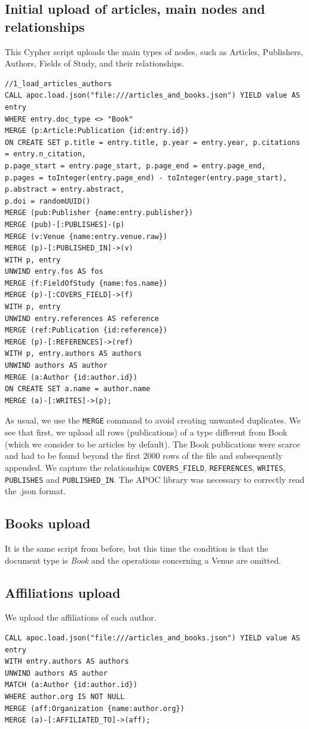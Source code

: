 \documentclass{Configuration_Files/PoliMi3i_thesis}
\begin{document}
\subsection{Initial upload of articles, main nodes and relationships}
This Cypher script uploads the main types of nodes, such as Articles, Publishers, Authors, Fields of Study, and their relationships.\\
\begin{lstlisting}[language=cypher, label=lst:cypher-example]
//1_load_articles_authors
CALL apoc.load.json("file:///articles_and_books.json") YIELD value AS 
entry
WHERE entry.doc_type <> "Book"
MERGE (p:Article:Publication {id:entry.id})
ON CREATE SET p.title = entry.title, p.year = entry.year, p.citations = entry.n_citation, 
p.page_start = entry.page_start, p.page_end = entry.page_end, 
p.pages = toInteger(entry.page_end) - toInteger(entry.page_start),
p.abstract = entry.abstract,
p.doi = randomUUID()
MERGE (pub:Publisher {name:entry.publisher})
MERGE (pub)-[:PUBLISHES]-(p)
MERGE (v:Venue {name:entry.venue.raw})
MERGE (p)-[:PUBLISHED_IN]->(v)
WITH p, entry
UNWIND entry.fos AS fos
MERGE (f:FieldOfStudy {name:fos.name})
MERGE (p)-[:COVERS_FIELD]->(f)
WITH p, entry
UNWIND entry.references AS reference
MERGE (ref:Publication {id:reference})
MERGE (p)-[:REFERENCES]->(ref)
WITH p, entry.authors AS authors
UNWIND authors AS author
MERGE (a:Author {id:author.id})
ON CREATE SET a.name = author.name
MERGE (a)-[:WRITES]->(p);
\end{lstlisting}
As usual, we use the \texttt{MERGE} command to avoid creating unwanted duplicates. We see that first, we upload all rows (publications) of a type different from Book (which we consider to be articles by default). The Book publications were scarce and had to be found beyond the first 2000 rows of the file and subsequently appended. We capture the relationships \texttt{COVERS\_FIELD}, \texttt{REFERENCES}, \texttt{WRITES}, \texttt{PUBLISHES} and \texttt{PUBLISHED\_IN}. The APOC library was necessary to correctly read the .json format.
\subsection{Books upload}
It is the same script from before, but this time the condition is that the document type is \textit{Book} and the operations concerning a Venue are omitted.
\subsection{Affiliations upload}
We upload the affiliations of each author. \\
\begin{lstlisting}[language=cypher, label=lst:cypher-example]
CALL apoc.load.json("file:///articles_and_books.json") YIELD value AS 
entry
WITH entry.authors AS authors
UNWIND authors AS author
MATCH (a:Author {id:author.id})
WHERE author.org IS NOT NULL
MERGE (aff:Organization {name:author.org})
MERGE (a)-[:AFFILIATED_TO]->(aff);
\end{lstlisting}
\end{document}

